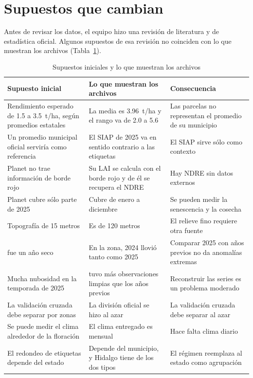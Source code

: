 \section{Supuestos que cambian}\label{sec:supuestos}
Antes de revisar los datos, el equipo hizo una revisión de literatura y de estadística oficial. Algunos supuestos de
esa revisión no coinciden con lo que muestran los archivos (Tabla~\ref{tab:supuestos}).

\begin{table}[!t]
\caption{Supuestos iniciales y lo que muestran los archivos}\label{tab:supuestos}
\centering\footnotesize
\begin{tabularx}{\textwidth}{@{}>{\raggedright\arraybackslash}p{4.6cm}>{\raggedright\arraybackslash}X>{\raggedright\arraybackslash}p{5.2cm}@{}}
\toprule
Supuesto inicial & Lo que muestran los archivos & Consecuencia \\
\midrule
Rendimiento esperado de 1.5 a 3.5~t/ha, según promedios estatales & La media es 3.96~t/ha y el rango va de 2.0 a 5.6 &
  Las parcelas no representan el promedio de su municipio \\
Un promedio municipal oficial serviría como referencia & El SIAP de 2025 va en sentido contrario a las etiquetas &
  El SIAP sirve sólo como contexto \\
Planet no trae información de borde rojo & Su LAI se calcula con el borde rojo y de él se recupera el NDRE &
  Hay NDRE sin datos externos \\
Planet cubre sólo parte de 2025 & Cubre de enero a diciembre & Se pueden medir la senescencia y la cosecha \\
Topografía de 15 metros & Es de 120 metros & El relieve fino requiere otra fuente \\
2024 fue un año seco & En la zona, 2024 llovió tanto como 2025 & Comparar 2025 con años previos no da anomalías extremas \\
Mucha nubosidad en la temporada de 2025 & 2025 tuvo más observaciones limpias que los años previos &
  Reconstruir las series es un problema moderado \\
La validación cruzada debe separar por zonas & La división oficial se hizo al azar & La validación cruzada debe separar al azar \\
Se puede medir el clima alrededor de la floración & El clima entregado es mensual & Hace falta clima diario \\
El redondeo de etiquetas depende del estado & Depende del municipio, y Hidalgo tiene de los dos tipos &
  El régimen reemplaza al estado como agrupación \\
\bottomrule
\end{tabularx}
\end{table}
